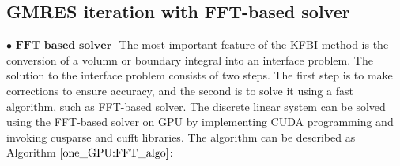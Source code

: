 \subsection{GMRES iteration with FFT-based solver} \label{one_GPU:solver} 
$\bullet \textbf{ FFT-based solver }$
The most important feature of the KFBI method is the conversion of a volumn or boundary integral into an interface problem. The solution to the interface problem consists of two steps. The first step is to make corrections to ensure accuracy, and the second is to solve it using a fast algorithm, such as  FFT-based solver\cite{Wu2013}. The discrete linear system  can be solved using the FFT-based solver on GPU by implementing CUDA programming and invoking cusparse\cite{naumov2010cusparse} and cufft libraries\cite{govindaraju2008high}. The algorithm can be described as 
Algorithm $\ref{one_GPU:FFT_algo}$:
